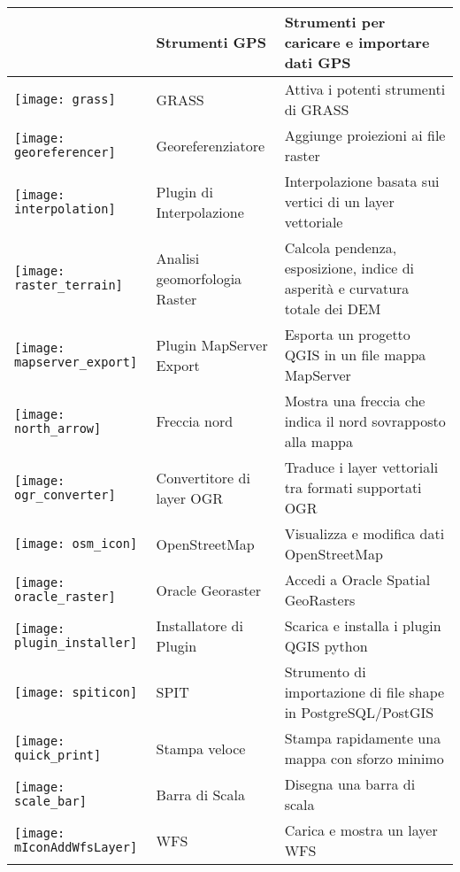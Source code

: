 \begin{minipage}{\textwidth}
\begin{table}[H]
\begin{tabular}{|l|l|p{4in}|}
 & Strumenti GPS \index{plugin!GPS}& Strumenti per caricare e importare dati GPS\\
\hline
\texttt{[image: grass]}
 & GRASS \index{plugin!strumenti GRASS} & Attiva i potenti strumenti di GRASS\\
\hline
\texttt{[image: georeferencer]}
 & Georeferenziatore \index{plugin!georeferenziatore} & Aggiunge proiezioni ai file raster\\
\hline
\texttt{[image: interpolation]}
& Plugin di Interpolazione \index{plugin!interpolazione}& Interpolazione basata sui vertici di un layer vettoriale\\
\hline
\texttt{[image: raster\_terrain]}
& Analisi geomorfologia Raster \index{plugins!Analisi morfologia raster}& Calcola pendenza, esposizione,
indice di asperità e curvatura totale dei DEM\\
\hline
\texttt{[image: mapserver\_export]}
& Plugin MapServer Export \index{plugin!esportazione verso MapServer}& Esporta un progetto QGIS
in un file mappa MapServer \\
\hline
\texttt{[image: north\_arrow]}
& Freccia nord \index{plugin!freccia nord}& Mostra una freccia che indica il nord sovrapposto alla mappa\\
\hline
\texttt{[image: ogr\_converter]}
 & Convertitore di layer OGR \index{plugin!convertitore OGR} & Traduce i layer vettoriali tra formati supportati OGR\\
\hline
\texttt{[image: osm\_icon]}
 & OpenStreetMap & Visualizza e modifica dati OpenStreetMap \\
\hline
\texttt{[image: oracle\_raster]}
 & Oracle Georaster \index{plugins!georaster}& Accedi a Oracle Spatial GeoRasters\\
\hline
\texttt{[image: plugin\_installer]}
 & Installatore di Plugin \index{plugin!installatore plugin Python} & Scarica e installa i plugin QGIS python\\
\hline
\texttt{[image: spiticon]}
 & SPIT \index{plugin!SPIT}& Strumento di importazione di file shape in PostgreSQL/PostGIS \\
\hline
\texttt{[image: quick\_print]}
 & Stampa veloce \index{plugin!stampa veloce}& Stampa rapidamente una mappa con sforzo minimo \\
\hline
\texttt{[image: scale\_bar]}
 & Barra di Scala \index{plugin!barra di scala}& Disegna una barra di scala\\
\hline
\texttt{[image: mIconAddWfsLayer]}
 & WFS & Carica e mostra un layer WFS\\
\hline
\end{tabular}
\end{table}
\end{minipage}

\normalsize

